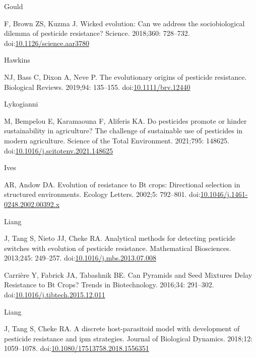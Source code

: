 \documentclass[10pt,letterpaper]{article}
\begin{document}
\nolinenumbers

%
%
% 
\begin{thebibliography}{30}

\hypertarget{ref-Gould2018}{Gould} F, Brown ZS, Kuzma J. {Wicked evolution: Can we address the sociobiological dilemma of pesticide resistance?} Science. 2018;360: 728--732. doi:\href{https://doi.org/10.1126/science.aar3780}{10.1126/science.aar3780}

\hypertarget{ref-Hawkins2019}{Hawkins} NJ, Bass C, Dixon A, Neve P. {The evolutionary origins of pesticide resistance}. Biological Reviews. 2019;94: 135--155. doi:\href{https://doi.org/10.1111/brv.12440}{10.1111/brv.12440}

\hypertarget{ref-Lykogianni2021}{Lykogianni} M, Bempelou E, Karamaouna F, Aliferis KA. {Do pesticides promote or hinder sustainability in agriculture? The challenge of sustainable use of pesticides in modern agriculture}. Science of the Total Environment. 2021;795: 148625. doi:\href{https://doi.org/10.1016/j.scitotenv.2021.148625}{10.1016/j.scitotenv.2021.148625}

\hypertarget{ref-Ives2002}{Ives} AR, Andow DA. {Evolution of resistance to Bt crops: Directional selection in structured environments}. Ecology Letters. 2002;5: 792--801. doi:\href{https://doi.org/10.1046/j.1461-0248.2002.00392.x}{10.1046/j.1461-0248.2002.00392.x}

\hypertarget{ref-Liang2013}{Liang} J, Tang S, Nieto JJ, Cheke RA. {Analytical methods for detecting pesticide switches with evolution of pesticide resistance}. Mathematical Biosciences. 2013;245: 249--257. doi:\href{https://doi.org/10.1016/j.mbs.2013.07.008}{10.1016/j.mbs.2013.07.008}

Carri\`{e}re Y, Fabrick JA, Tabashnik BE. {Can Pyramids and Seed Mixtures Delay Resistance to Bt Crops?} Trends in Biotechnology. 2016;34: 291--302. doi:\href{https://doi.org/10.1016/j.tibtech.2015.12.011}{10.1016/j.tibtech.2015.12.011}

\hypertarget{ref-Liang2018}{Liang} J, Tang S, Cheke RA. {A discrete host-parasitoid model with development of pesticide resistance and ipm strategies}. Journal of Biological Dynamics. 2018;12: 1059--1078. doi:\href{https://doi.org/10.1080/17513758.2018.1556351}{10.1080/17513758.2018.1556351}


\end{thebibliography}
\end{document}
